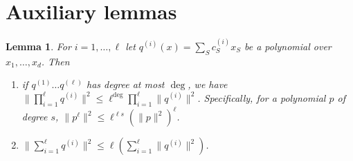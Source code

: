 \documentclass{article}
\newtheorem{lemma}[theorem]{Lemma}
\begin{document}
\section{Auxiliary lemmas}
\begin{lemma}
   For $i=1,\ldots, \ell$ let $q^{(i)}(x)=\sum_S c^{(i)}_{S} x_S $ be a polynomial over $x_1, \ldots, x_d$. Then
   \begin{enumerate}
     \item if $q^{(1)}\ldots q^{(\ell)}$ has degree at most $\deg$, we have $\|\prod_{i=1}^{\ell} q^{(i)}\|^2 \leq \ell^{\deg} \prod_{i=1}^{\ell} \|q^{(i)}\|^2$. Specifically, for a polynomial $p$ of degree $s$, $\|p^\ell \|^2 \leq  \ell^{\ell s} (\|p\|^2)^\ell$.
     \item $\|\sum_{i=1}^{\ell} q^{(i)}\|^2 \leq \ell(\sum_{i=1}^{\ell} \|q^{(i)}\|^2)$.
   \end{enumerate}
   \label{lem:norm-oper}
\end{lemma}



\newpage


\end{document}
